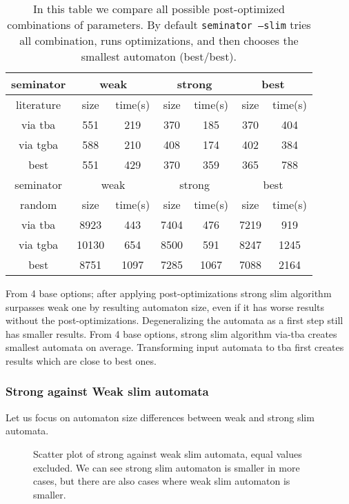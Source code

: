\documentclass[
	digital
nolof, nolot
]{fithesis3}
\begin{document}
	\begin{table}[ht]
		\centering
		\caption{In this table we compare all possible post-optimized combinations of parameters. By default \texttt{seminator --slim} tries all combination, runs optimizations, and then chooses the smallest automaton (best/best). }
		\begin{tabular}{ |c||c|c|c|c|c|c| } 
			\hline
			seminator&\multicolumn{2}{c|}{weak}&\multicolumn{2}{c|}{strong}&\multicolumn{2}{c|}{best} \\
			\hline
			literature&size&time(s)&size&time(s)&size&time(s)\\
			\hhline{|=======|}
			
			via tba&551&219& 370 &185& 370&404\\
			\hline
			via tgba&588&210& 408&174& 402&384\\ 
			\hline
			best&551&429& 370&359& 365&788 \\ 
			\hline
			
			
			\hline
			seminator&\multicolumn{2}{c|}{weak}&\multicolumn{2}{c|}{strong}&\multicolumn{2}{c|}{best} \\
			\hline
			random&size&time(s)&size&time(s)&size&time(s)\\
			\hhline{|=======|}
			via tba&8923&443& 7404 &476& 7219&919\\
			\hline
			via tgba&10130&654& 8500&591& 8247&1245\\ 
			\hline
			best&8751&1097& 7285&1067& 7088&2164 \\ 
			\hline
		\end{tabular}
	\end{table}

	
	From 4 base options; after applying post-optimizations strong slim algorithm surpasses weak one by resulting automaton size, even if it has worse results without the post-optimizations.
	Degeneralizing the automata as a first step still has smaller results.
	From 4 base options, strong slim algorithm via-tba creates smallest automata on average.
	Transforming input automata to tba first creates results which are close to best ones. 
	
	\clearpage
	\subsubsection{Strong against Weak slim automata}
	Let us focus on automaton size differences between weak and strong slim automata.
		\begin{figure}[ht]
			\centering 
			\caption{Scatter plot of strong against weak slim automata, equal values excluded. We can see strong slim automaton is smaller in more cases, but there are also cases where weak slim automaton is smaller.}
		
		\begin{tikzpicture}
			
		\end{tikzpicture}
	\end{figure}
	
\end{document}
